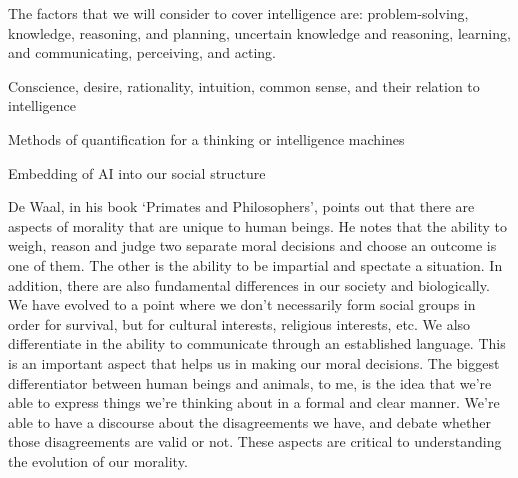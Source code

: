 \documentclass[11pt]{article}
\begin{document}
\par The factors that we will consider to cover intelligence are: problem-solving, knowledge, reasoning, and planning, uncertain knowledge and reasoning, learning, and communicating, perceiving, and acting.

\begin{center}
	{\large Conscience, desire, rationality, intuition, common sense, and their relation to intelligence\par}
\end{center}

\begin{center}
	{\large Methods of quantification for a thinking or intelligence machines\par}
\end{center}

\begin{center}
	{\large Embedding of AI into our social structure\par}
\end{center}

\par De Waal, in his book `Primates and Philosophers', points out that there are aspects of morality that are unique to human beings. He notes that the ability to weigh, reason and judge two separate moral decisions and choose an outcome is one of them. The other is the ability to be impartial and spectate a situation. In addition, there are also fundamental differences in our society and biologically. We have evolved to a point where we don't necessarily form social groups in order for survival, but for cultural interests, religious interests, etc. We also differentiate in the ability to communicate through an established language. This is an important aspect that helps us in making our moral decisions. The biggest differentiator between human beings and animals, to me, is the idea that we're able to express things we're thinking about in a formal and clear manner. We're able to have a discourse about the disagreements we have, and debate whether those disagreements are valid or not. These aspects are critical to understanding the evolution of our morality.
\end{document}
